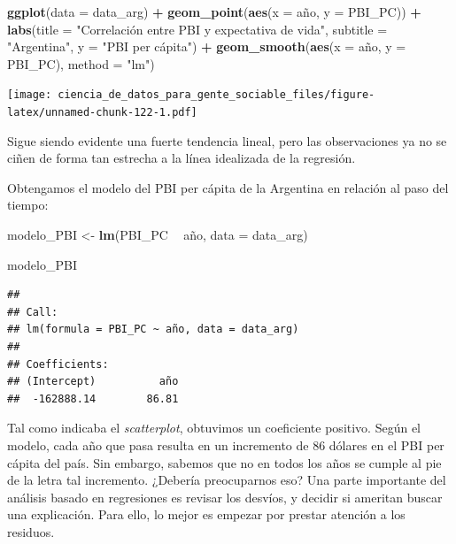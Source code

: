 \documentclass[spanish,]{book}
\newenvironment{Shaded}{\begin{snugshade}}{\end{snugshade}}
\newcommand{\DataTypeTok}[1]{\textcolor[rgb]{0.13,0.29,0.53}{#1}}
\newcommand{\KeywordTok}[1]{\textcolor[rgb]{0.13,0.29,0.53}{\textbf{#1}}}
\newcommand{\NormalTok}[1]{#1}
\newcommand{\OperatorTok}[1]{\textcolor[rgb]{0.81,0.36,0.00}{\textbf{#1}}}
\newcommand{\StringTok}[1]{\textcolor[rgb]{0.31,0.60,0.02}{#1}}
\begin{document}
\begin{Shaded}
\begin{Highlighting}[]
\KeywordTok{ggplot}\NormalTok{(}\DataTypeTok{data =}\NormalTok{ data_arg) }\OperatorTok{+}\StringTok{ }
\StringTok{    }\KeywordTok{geom_point}\NormalTok{(}\KeywordTok{aes}\NormalTok{(}\DataTypeTok{x =}\NormalTok{ año, }\DataTypeTok{y =}\NormalTok{ PBI_PC)) }\OperatorTok{+}
\StringTok{    }\KeywordTok{labs}\NormalTok{(}\DataTypeTok{title =} \StringTok{"Correlación entre PBI y expectativa de vida"}\NormalTok{,}
         \DataTypeTok{subtitle =} \StringTok{"Argentina"}\NormalTok{,}
         \DataTypeTok{y =} \StringTok{"PBI per cápita"}\NormalTok{) }\OperatorTok{+}
\StringTok{    }\KeywordTok{geom_smooth}\NormalTok{(}\KeywordTok{aes}\NormalTok{(}\DataTypeTok{x =}\NormalTok{ año, }\DataTypeTok{y =}\NormalTok{ PBI_PC), }\DataTypeTok{method =} \StringTok{"lm"}\NormalTok{)}
\end{Highlighting}
\end{Shaded}

\texttt{[image: ciencia\_de\_datos\_para\_gente\_sociable\_files/figure-latex/unnamed-chunk-122-1.pdf]}

Sigue siendo evidente una fuerte tendencia lineal, pero las observaciones ya no se ciñen de forma tan estrecha a la línea idealizada de la regresión.

Obtengamos el modelo del PBI per cápita de la Argentina en relación al paso del tiempo:

\begin{Shaded}
\begin{Highlighting}[]
\NormalTok{modelo_PBI <-}\StringTok{ }\KeywordTok{lm}\NormalTok{(PBI_PC }\OperatorTok{~}\StringTok{ }\NormalTok{año, }\DataTypeTok{data =}\NormalTok{ data_arg)}

\NormalTok{modelo_PBI}
\end{Highlighting}
\end{Shaded}

\begin{verbatim}
## 
## Call:
## lm(formula = PBI_PC ~ año, data = data_arg)
## 
## Coefficients:
## (Intercept)          año  
##  -162888.14        86.81
\end{verbatim}

Tal como indicaba el \emph{scatterplot}, obtuvimos un coeficiente positivo. Según el modelo, cada año que pasa resulta en un incremento de 86 dólares en el PBI per cápita del país. Sin embargo, sabemos que no en todos los años se cumple al pie de la letra tal incremento. ¿Debería preocuparnos eso? Una parte importante del análisis basado en regresiones es revisar los desvíos, y decidir si ameritan buscar una explicación. Para ello, lo mejor es empezar por prestar atención a los residuos.
\end{document}
